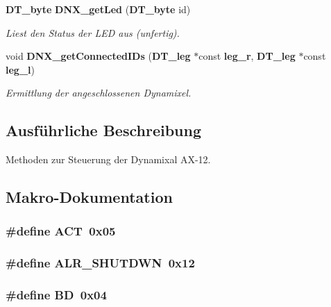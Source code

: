 \begin{DoxyCompactItemize}
{\bf DT\_\-byte} {\bf DNX\_\-getLed} ({\bf DT\_\-byte} id)
\begin{DoxyCompactList}\small\item\em Liest den Status der LED aus (unfertig). \item\end{DoxyCompactList}\item 
void {\bf DNX\_\-getConnectedIDs} ({\bf DT\_\-leg} $\ast$const {\bf leg\_\-r}, {\bf DT\_\-leg} $\ast$const {\bf leg\_\-l})
\begin{DoxyCompactList}\small\item\em Ermittlung der angeschlossenen Dynamixel. \item\end{DoxyCompactList}\end{DoxyCompactItemize}


\subsection{Ausführliche Beschreibung}
Methoden zur Steuerung der Dynamixal AX-\/12. 

\subsection{Makro-\/Dokumentation}
\subsubsection[{ACT}]{\setlength{\rightskip}{0pt plus 5cm}\#define ACT~0x05}\label{dynamixel_8c_a8b1f9873f78b1d80ab85bdd8168ce794}
\subsubsection[{ALR\_\-SHUTDWN}]{\setlength{\rightskip}{0pt plus 5cm}\#define ALR\_\-SHUTDWN~0x12}\label{dynamixel_8c_a143721b24487712fbe65f1a0f93b6c1d}
\subsubsection[{BD}]{\setlength{\rightskip}{0pt plus 5cm}\#define BD~0x04}\label{dynamixel_8c_a920971eab600c52963635b965ba64898}
